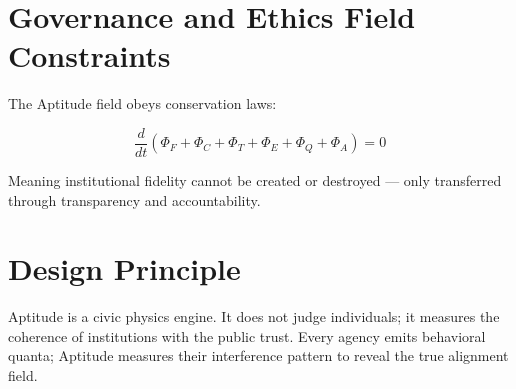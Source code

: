 \documentclass[a4paper,11pt]{article}
\begin{document}
	\section{Governance and Ethics Field Constraints}
	
	The Aptitude field obeys conservation laws:
	
	
	
	\[
	\frac{d}{dt}(\Phi_F + \Phi_C + \Phi_T + \Phi_E + \Phi_Q + \Phi_A) = 0
	\]
	
	
	
	Meaning institutional fidelity cannot be created or destroyed — only transferred through transparency and accountability.
	
	\section{Design Principle}
	
	Aptitude is a civic physics engine.  
	It does not judge individuals; it measures the coherence of institutions with the public trust.  
	Every agency emits behavioral quanta; Aptitude measures their interference pattern to reveal the true alignment field.
	
\end{document}

